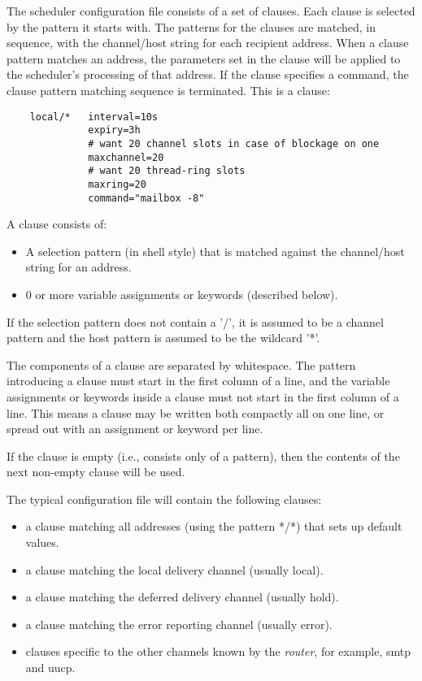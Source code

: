 The scheduler configuration file consists of a set  of
clauses. Each clause is selected by the pattern it starts
with. The patterns  for  the  clauses   are  matched,  in
sequence, with the channel/host string for each recipient
address. When a clause pattern matches  an  address,  the
parameters set in the clause will be applied to the scheduler's 
processing of that address. If the clause specifies a command,  
the clause pattern matching sequence is terminated. This is a clause:

\begin{verbatim}
    local/*   interval=10s
              expiry=3h
              # want 20 channel slots in case of blockage on one
              maxchannel=20
              # want 20 thread-ring slots
              maxring=20
              command="mailbox -8"
\end{verbatim}

A clause consists of:

\begin{itemize}
\item A selection pattern  (in  shell style) that  is
matched  against        the  channel/host  string  for an
address.
\item 0  or more  variable assignments or keywords
(described below).
\end{itemize}


If the selection pattern does not contain a '/', it is
assumed to be a channel pattern and the host  pattern  is
assumed to be the wildcard '*'.

The components of a clause are separated by whitespace.
The pattern introducing a clause must start in the first
column of a line, and the variable assignments or keywords
inside a clause must not start in the first  column of a
line. This means a clause may be written both compactly
all on one line, or spread out with an assignment or keyword per line.

If the clause is empty (i.e., consists only of a pattern),
then the contents of the next non-empty clause will be used.

The typical configuration file will contain the following clauses:
\begin{itemize}
\item a clause matching all addresses (using the pattern */*) that sets 
up default values.
\item a  clause  matching  the  local delivery channel
(usually local).
\item a clause matching the deferred    delivery  channel
(usually hold).
\item a  clause  matching  the error reporting channel
(usually error).
\item clauses specific to the other channels    known  by
the {\em router\/}, for example, smtp and uucp.
\end{itemize}


